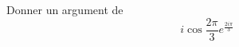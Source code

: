Donner un argument de 
\begin{displaymath}
 i\cos \frac{2\pi}{3}e^{\frac{2i\pi}{3}}
\end{displaymath}
\bigskip \bigskip